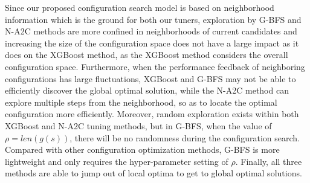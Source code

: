 Since our proposed configuration search model is based on neighborhood information which is the ground for both our tuners, exploration by G-BFS and N-A2C methods are more confined in neighborhoods of current candidates and increasing the size of the configuration space does not have a large impact as it does on the XGBoost method, as the XGBoost method considers the overall configuration space.  Furthermore, when the performance feedback of neighboring configurations has large fluctuations, XGBoost and G-BFS may not be able to efficiently discover the global optimal solution, while the N-A2C method can explore multiple steps from the neighborhood, so as to locate the optimal configuration more efficiently. Moreover, random exploration exists within both XGBoost and N-A2C tuning methods, but in G-BFS, when the value of $\rho = len(g(s))$, there will be no randomness during the configuration search. Compared with other configuration optimization methods, G-BFS is more lightweight and only requires the hyper-parameter setting of $\rho$. Finally, all three methods are able to jump out of  local optima to get to global optimal solutions.

